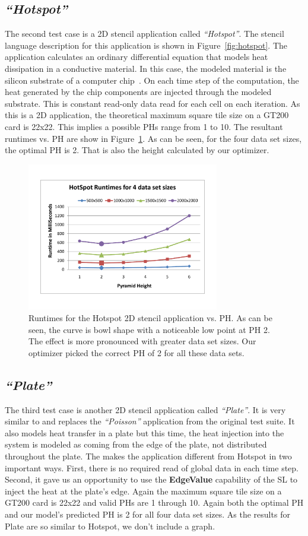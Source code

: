 \documentclass[preprint,nocopyrightspace]{styles/sigplanconf}
\begin{document}
\subsection{\em ``Hotspot''}
The second test case is a 2D stencil application called {\em ``Hotspot''}.  
The stencil language description for this application is shown in Figure~\ref{fig:hotspot}.
The application calculates an ordinary differential equation that models heat dissipation in a conductive material.  
In this case, the modeled material is the silicon substrate of a computer chip~\cite{hotspot}.
On each time step of the computation, the heat generated by the chip components are injected through the modeled substrate.  
This is constant read-only data read for each cell on each iteration.  As this is a 2D application, 
the theoretical maximum square tile size on a GT200 card is 22x22.
This implies a possible PHs range from 1 to 10.  The resultant runtimes vs. PH are show in
Figure~\ref{fig:hotspotTimes}.  As can be seen, for the four data set sizes, the optimal PH is 2.
That is also the height calculated by our optimizer.  
\begin{figure}
\includegraphics[clip,trim=1in 1in 1in 1in,width=3.3in]{figures/HotSpotTimingData}
\caption{Runtimes for the Hotspot 2D stencil application vs. PH.
As can be seen, the curve is bowl shape with a noticeable low point at PH 2.  The effect is more pronounced
with greater data set sizes.  Our optimizer picked the correct PH of 2 for all these data sets.}
\label{fig:hotspotTimes}
\end{figure}

\subsection{\em ``Plate''}
The third test case is another 2D stencil application called {\em ``Plate''}.  
It is very similar to and replaces the {\em ``Poisson''} application from the original test suite.  
It also models heat transfer in a plate but this time, the heat 
injection into the system is modeled as coming from the edge of the plate, not distributed throughout the plate.  
The makes the application different from Hotspot in two important ways.  
First, there is no required read of global data in each time step.  
Second, it gave us an opportunity to use the {\bf EdgeValue} capability of 
the SL to inject the heat at the plate's edge.  
Again the maximum square tile size on a GT200 card is 22x22 and valid PHs are 1 through 10.  
Again both the optimal PH and our model's predicted PH is 2 for all four data set sizes.
As the results for Plate are so similar to Hotspot, we don't include a graph.
\end{document}
